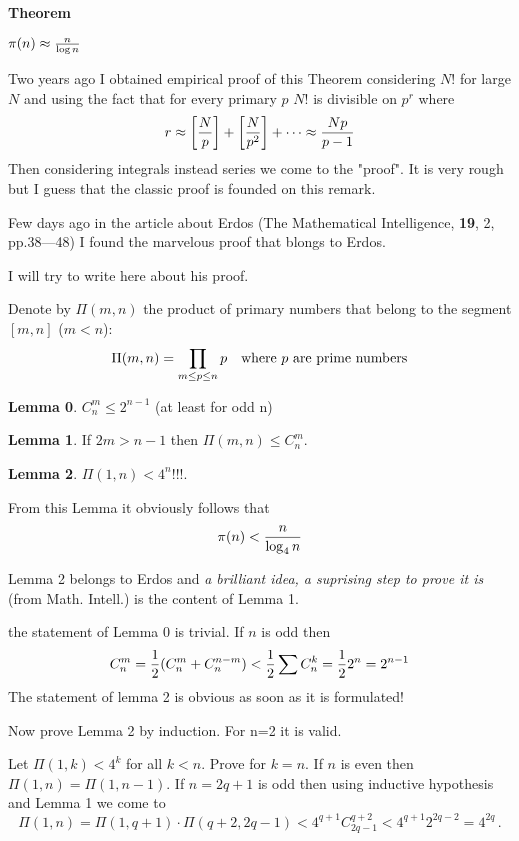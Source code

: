 
 {\bf Theorem}

           $\pi(n)\approx {n\over \log n}$



Two years ago I obtained  empirical proof of this Theorem
 considering $N!$ for large $N$ and using the fact that
 for every primary $p$ $N!$ is divisible on $p^r$
 where
   $$
  r\approx \left[N\over p\right]+\left[N\over p^2\right]+\dots
  \approx {Np\over p-1}
         $$
Then considering integrals instead series we come to the "proof".
It is very rough but I guess that the classic proof is founded on
this remark.

\smallskip

Few days ago in the article about Erdos (The Mathematical Intelligence,
{\bf 19}, 2, pp.38---48) I found the marvelous proof that blongs to Erdos.

I will try to write here about his proof.

  Denote by $\Pi (m,n)$ the product of primary numbers
  that belong to the segment $[m,n]$ ($m<n$):
                      $$
                      \Pi(m,n)=\prod_{m\leq p\leq n} p
                      \quad \hbox {where $p$ are prime numbers}
                      $$

  {\bf Lemma 0}.   $C^m_n\leq 2^{n-1}$ (at least for odd n)

\medskip

  {\bf Lemma 1}. If $2m>n-1$ then $\Pi(m,n)\leq C^m_n$.

\medskip

  {\bf Lemma 2}. $\Pi (1,n)<4^n$!!!.

 From this Lemma it obviously follows that
               $$
          \pi(n)<{n\over \log_4 n}
          $$

\medskip

  Lemma 2 belongs to Erdos and
  {\it a brilliant idea, a suprising step
     to prove it is} (from Math. Intell.) is the  content of Lemma 1.

 the statement of Lemma 0 is trivial. If $n$ is odd then
                  $$
   C^m_n={1\over 2}(C^m_n+C^{n-m}_n)<{1\over 2}\sum C^k_n=
         {1\over 2}2^n=2^{n-1}
                   $$
 The statement of lemma 2 is obvious as soon as it is formulated!

 Now prove Lemma 2 by induction. For n=2 it is valid.

 Let $\Pi (1,k)<4^k$ for all $k<n$. Prove for $k=n$.
 If $n$ is even then $\Pi(1,n)=\Pi(1,n-1)$.
 If $n=2q+1$ is odd then using inductive hypothesis and Lemma 1
  we come to
 $$
 \Pi(1,n)=\Pi(1,q+1)\cdot\Pi(q+2,2q-1)<4^{q+1}C^{q+2}_{2q-1}<
     4^{q+1}2^{2q-2}=4^{2q}\,.$$

 \bye
